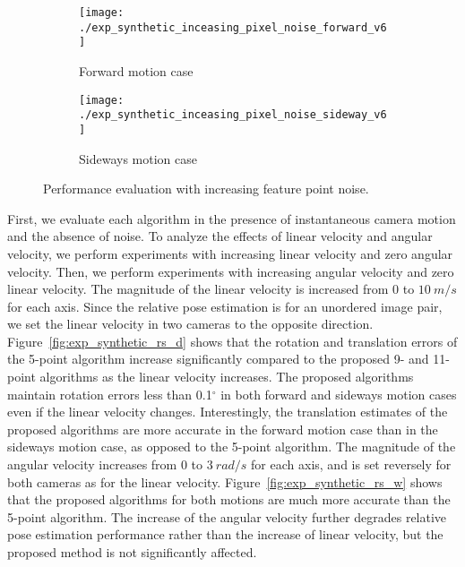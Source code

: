 \documentclass[10pt,twocolumn,letterpaper]{article}
\theoremstyle{definition}
\begin{document}
	
	\begin{figure}[t]
		\begin{subfigure}[b]{0.99\linewidth}
			\texttt{[image: ./exp\_synthetic\_inceasing\_pixel\_noise\_forward\_v6]}
			\caption{Forward motion case}
		\end{subfigure}
		\begin{subfigure}[b]{0.99\linewidth}
			\texttt{[image: ./exp\_synthetic\_inceasing\_pixel\_noise\_sideway\_v6]}
			\caption{Sideways motion case}
		\end{subfigure}%
		\caption{Performance evaluation with increasing feature point noise.}
		\label{fig:exp_synthetic_pixel_noise}
	\end{figure}
	
	
	First, we evaluate each algorithm in the presence of instantaneous camera motion and the absence of noise.
	To analyze the effects of linear velocity and angular velocity, we perform experiments with increasing linear velocity and zero angular velocity.
	Then, we perform experiments with increasing angular velocity and zero linear velocity.
	The magnitude of the linear velocity is increased from $0$ to $10 \ m/s$ for each axis.
	Since the relative pose estimation is for an unordered image pair, we set the linear velocity in two cameras to the opposite direction.
	Figure~\ref{fig:exp_synthetic_rs_d} shows that the rotation and translation errors of the 5-point algorithm \cite{Nister:PAMI:2004} increase significantly compared to the proposed 9- and 11-point algorithms as the linear velocity increases.
	The proposed algorithms maintain rotation errors less than 0.1$^{\circ}$ in both forward and sideways motion  cases even if the linear velocity changes.
	Interestingly, the translation estimates of the proposed algorithms are more accurate in the forward motion case than in the sideways motion case, as opposed to the 5-point algorithm.
	The magnitude of the angular velocity increases from $0$ to $3 \ rad/s$ for each axis, and is set reversely for both cameras as for the linear velocity.
	Figure~\ref{fig:exp_synthetic_rs_w}  shows that the proposed algorithms for both motions are much more accurate than the 5-point algorithm.
	The increase of the angular velocity further degrades relative pose estimation performance rather than the increase of linear velocity, but the proposed method is not significantly affected.
	
\end{document}
